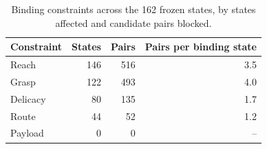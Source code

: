 \begin{table}[H]
\centering
\caption{Binding constraints across the \num{162} frozen states, by states affected and candidate pairs blocked.}
\label{tab:ex1:binding}
\begin{tabular}{lrrr}
\toprule
Constraint & States & Pairs & Pairs per binding state \\
\midrule
Reach & 146 & 516 & 3.5 \\
Grasp & 122 & 493 & 4.0 \\
Delicacy & 80 & 135 & 1.7 \\
Route & 44 & 52 & 1.2 \\
\midrule
Payload & 0 & 0 & -- \\
\bottomrule
\end{tabular}
\end{table}
